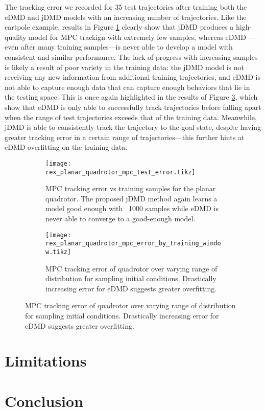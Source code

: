 \documentclass{article}
\begin{document}
The tracking error we recorded for 35 test trajectories after training both the eDMD 
and jDMD models with an increasing number of trajectories. Like the cartpole example,
results in Figure \ref{fig:rex_planar_quadrotor_mpc_test_error} clearly show that jDMD
produces a high-quality model for MPC trackign with extremely few samples, whereas eDMD
---even after many training samples---is never able to develop a model with consistent
and similar performance. The lack of progress with increasing samples is likely a result
of poor variety in the training data: the jDMD model is not receiving any new information
from additional training trajectories, and eDMD is not able to capture enough data that
can capture enough behaviors that lie in the testing space. This is once again highlighted
in the results of Figure \ref{fig:rex_planar_quadrotor_mpc_error_by_training_window}, which
show that eDMD is only able to successfully track trajectories before falling apart when the
range of test trajectories exceeds that of the training data. Meanwhile, jDMD is able to consistently
track the trajectory to the goal state, despite having greater tracking error in a certain range
of trajectories---this further hints at eDMD overfitting on the training data.

\begin{figure}[t]
	\centering
	\begin{subfigure}[t]{0.48\textwidth}
		\raggedleft
		\texttt{[image: rex\_planar\_quadrotor\_mpc\_test\_error.tikz]}
		\caption{MPC tracking error vs training samples for the planar quadrotor. The proposed jDMD method again learns a model good enough with ~1000 samples while eDMD is never able to converge to a good-enough model.}
		\label{fig:rex_planar_quadrotor_mpc_test_error}
	\end{subfigure}
	\hfill
	\begin{subfigure}[t]{0.48\textwidth}
		\raggedright
		\texttt{[image: rex\_planar\_quadrotor\_mpc\_error\_by\_training\_window.tikz]}
		\caption{MPC tracking error of quadrotor over varying range of distribution for sampling initial conditions. Drastically increasing error for eDMD suggests greater overfitting.}
		\label{fig:rex_planar_quadrotor_mpc_error_by_training_window}
	\end{subfigure}
\end{figure}

\section{Limitations} \label{sec:limitations}

\section{Conclusion} \label{sec:conclusion}


\end{document}
